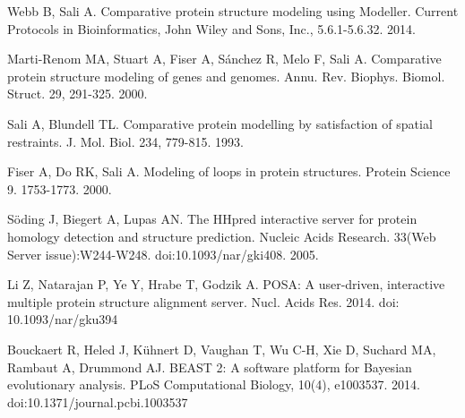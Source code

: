 \documentclass[10pt,letterpaper]{article}
\begin{document}
%
%
% 
\begin{thebibliography}{10}



Webb B, Sali A.
\newblock Comparative protein structure modeling using Modeller.
\newblock Current Protocols in Bioinformatics, John Wiley and Sons, Inc., 5.6.1-5.6.32. 2014.

% 
Marti-Renom MA, Stuart A, Fiser A, Sánchez R, Melo F, Sali A. 
\newblock Comparative protein structure modeling of genes and genomes.
\newblock Annu. Rev. Biophys. Biomol. Struct. 29, 291-325. 2000.

%
Sali A, Blundell TL.
\newblock Comparative protein modelling by satisfaction of spatial restraints.
\newblock J. Mol. Biol. 234, 779-815. 1993.

% 
Fiser A, Do RK, Sali A.
\newblock Modeling of loops in protein structures.
\newblock Protein Science 9. 1753-1773. 2000.

Söding J, Biegert A, Lupas AN.
\newblock The HHpred interactive server for protein homology detection and structure prediction. 
\newblock Nucleic Acids Research. 33(Web Server issue):W244-W248. doi:10.1093/nar/gki408. 2005.

Li Z, Natarajan P, Ye Y, Hrabe T, Godzik A.
\newblock POSA: A user-driven, interactive multiple protein structure alignment server.
\newblock Nucl. Acids Res. 2014. doi: 10.1093/nar/gku394

Bouckaert R, Heled J, Kühnert D, Vaughan T, Wu C-H, Xie D, Suchard MA, Rambaut A, Drummond AJ.
\newblock BEAST 2: A software platform for Bayesian evolutionary analysis.
\newblock PLoS Computational Biology, 10(4), e1003537. 2014. doi:10.1371/journal.pcbi.1003537


\end{thebibliography}
\end{document}
